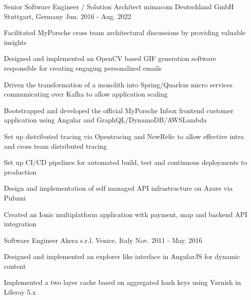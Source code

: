 \begin{cventries}
  \cventry
    {Senior Software Engineer / Solution Architect} %
    {mimacom Deutschland GmbH} %
    {Stuttgart, Germany} %
    {Jun. 2016 - Aug. 2022} %
    {
      \begin{cvitems} %
        \item {Facilitated MyPorsche cross team architectural discussions by providing valuable insights}
        \item {Designed and implemented an OpenCV based GIF generation software responsible for creating engaging personalized emails}
        \item {Driven the transformation of a monolith into Spring/Quarkus micro services communicating over Kafka to allow application scaling}
        \item {Bootstrapped and developed the official MyPorsche Inbox frontend customer application using Angular and GraphQL/DynamoDB/AWSLambda}
        \item {Set up distributed tracing via Opentracing and NewRelic to allow effective intra and cross team distributed tracing}
        \item {Set up CI/CD pipelines for automated build, test and continuous deployments to production}
        \item {Design and implementation of self managed API infrastructure on Azure via Pulumi}
        \item {Created an Ionic multiplatform application with payment, map and backend API integration}
      \end{cvitems}
    }

  \cventry
    {Software Engineer} %
    {Akera s.r.l.} %
    {Venice, Italy} %
    {Nov. 2011 - May. 2016} %
    {
      \begin{cvitems} %
        \item {Designed and implemented an explorer like interface in AngularJS for dynamic content}
        \item {Implemented a two layer cache based on aggregated hash keys using Varnish in Liferay 5.x}
      \end{cvitems}
    }

\end{cventries}
